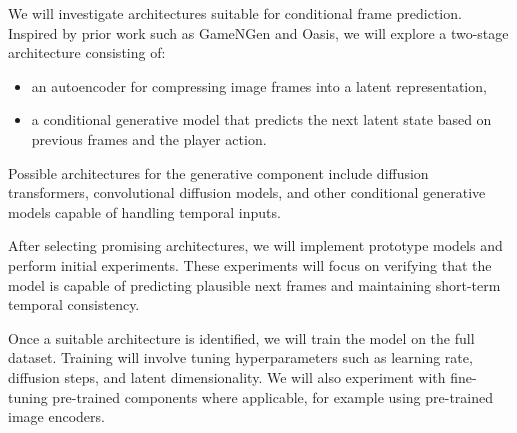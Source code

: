 \documentclass[twocolumn,a4paper]{article}
\begin{document}


We will investigate architectures suitable for conditional frame prediction. Inspired by prior work such as GameNGen and Oasis, we will explore a two-stage architecture consisting of:

\begin{itemize}
\item an autoencoder for compressing image frames into a latent representation,
\item a conditional generative model that predicts the next latent state based on previous frames and the player action.
\end{itemize}

Possible architectures for the generative component include diffusion transformers, convolutional diffusion models, and other conditional generative models capable of handling temporal inputs.


After selecting promising architectures, we will implement prototype models and perform initial experiments. These experiments will focus on verifying that the model is capable of predicting plausible next frames and maintaining short-term temporal consistency.



Once a suitable architecture is identified, we will train the model on the full dataset. Training will involve tuning hyperparameters such as learning rate, diffusion steps, and latent dimensionality. We will also experiment with fine-tuning pre-trained components where applicable, for example using pre-trained image encoders.
\end{document}
